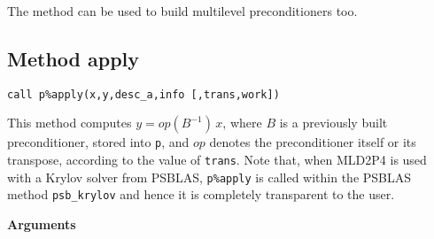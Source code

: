 \noindent
The method can be used to build multilevel preconditioners too.


\clearpage
\subsection{Method apply\label{sec:precapply}}

\begin{center}
\verb|call p%apply(x,y,desc_a,info [,trans,work])|\\
\end{center}

\noindent
This method computes $y = op(B^{-1})\, x$, where $B$ is a previously built
preconditioner, stored into \verb|p|, and $op$
denotes the preconditioner itself or its transpose, according to
the value of \verb|trans|.
Note that, when MLD2P4 is used with a Krylov solver from PSBLAS,
\verb|p%apply| is called within the PSBLAS method \verb|psb_krylov|
and hence it is completely transparent to the user.

{\baselineskip\noindent\large\bfseries Arguments} \smallskip


